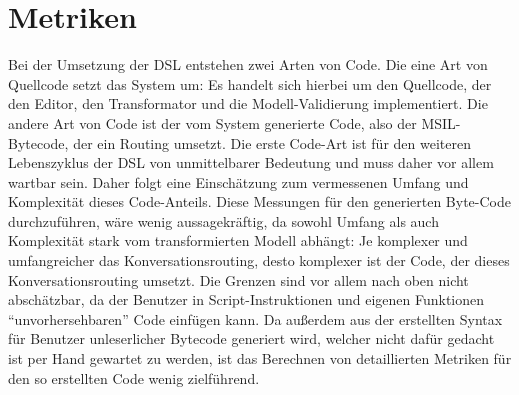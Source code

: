 \section{Metriken}
Bei der Umsetzung der DSL entstehen zwei Arten von Code. Die eine Art von Quellcode setzt das System um: Es handelt sich hierbei um den Quellcode, der den Editor, den Transformator und die Modell-Validierung implementiert. Die andere Art von Code ist der vom System generierte Code, also der MSIL-Bytecode, der ein Routing umsetzt. Die erste Code-Art ist für den weiteren Lebenszyklus der DSL von unmittelbarer Bedeutung und muss daher vor allem wartbar sein. Daher folgt eine Einschätzung zum vermessenen Umfang und Komplexität dieses Code-Anteils. Diese Messungen für den generierten Byte-Code durchzuführen, wäre  wenig aussagekräftig, da sowohl Umfang als auch Komplexität stark vom transformierten Modell abhängt: Je komplexer und umfangreicher das Konversationsrouting, desto komplexer ist der Code, der dieses Konversationsrouting umsetzt. Die Grenzen sind vor allem nach oben nicht abschätzbar, da der Benutzer in Script-Instruktionen und eigenen Funktionen ``unvorhersehbaren'' Code einfügen kann. Da außerdem aus der erstellten Syntax für Benutzer unleserlicher Bytecode generiert wird, welcher nicht dafür gedacht ist per Hand gewartet zu werden, ist das Berechnen von detaillierten Metriken für den so erstellten Code wenig zielführend. 

